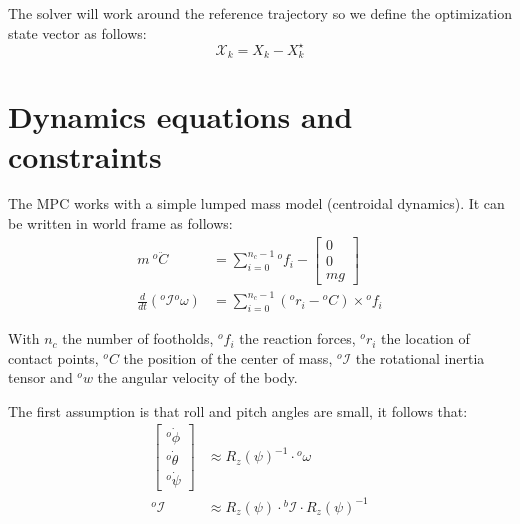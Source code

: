 \documentclass[a4paper,11pt]{article}
\begin{document}
The solver will work around the reference trajectory so we define the optimization state vector as follows:
\begin{equation}\mathcal{X}_k = X_k - X_k^\star \end{equation}

\newpage
\section{Dynamics equations and constraints}

The MPC works with a simple lumped mass model (centroidal dynamics). It can be written in world frame as follows:
\begin{align}
	m ~ {}^o\!  \ddot C &= \sum_{i=0}^{n_c - 1} {}^o\!f_i - \begin{bmatrix} 0 \\ 0 \\ mg \end{bmatrix} \label{eq:c_linear}\\
	\frac{d}{dt}({}^o\!\mathcal{I} {}^o\!\omega) &= \sum_{i=0}^{n_c - 1} ({}^o\!r_i - {}^o\!C) \times {}^o\!f_i \label{eq:c_angular}
\end{align}

With $n_c$ the number of footholds, ${}^o\!f_i$ the reaction forces, ${}^o\!r_i$ the location of contact points, ${}^o\!C$ the position of the center of mass, ${}^o\!\mathcal{I}$ the rotational inertia tensor and ${}^o\!w$ the angular velocity of the body.

The first assumption is that roll and pitch angles are small, it follows that:
\begin{align}
\begin{bmatrix} {}^o\! \dot \phi \\ {}^o\! \dot \theta \\ {}^o\! \dot \psi \end{bmatrix} &\approx R_z(\psi)^{-1} \cdot {}^o\!\omega \label{eq:assumption1} \\ 
{}^o\! \mathcal{I} &\approx R_z(\psi) \cdot {}^b\! \mathcal{I} \cdot R_z(\psi)^{-1} 
\end{align}
\end{document}
